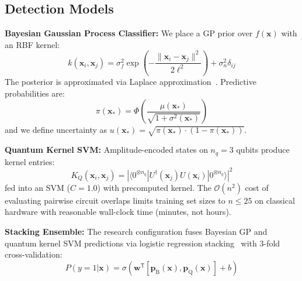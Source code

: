 \documentclass[conference,10pt]{IEEEtran}
\begin{document}
\subsection{Detection Models}

\textbf{Bayesian Gaussian Process Classifier:} We place a GP prior over $f(\mathbf{x})$ with an RBF kernel:
\begin{equation}
k(\mathbf{x}_i, \mathbf{x}_j) = \sigma_f^2 \exp\!\left(-\frac{\|\mathbf{x}_i - \mathbf{x}_j\|^2}{2\ell^2}\right) + \sigma_n^2 \delta_{ij}
\end{equation}
The posterior is approximated via Laplace approximation~\cite{rasmussen2006gaussian}. Predictive probabilities are:
\begin{equation}
\pi(\mathbf{x}_*) = \Phi\!\left(\frac{\mu(\mathbf{x}_*)}{\sqrt{1 + \sigma^2(\mathbf{x}_*)}}\right)
\label{eq:gppredict}
\end{equation}
and we define uncertainty as $u(\mathbf{x}_*) = \sqrt{\pi(\mathbf{x}_*) \cdot (1 - \pi(\mathbf{x}_*))}$.

\textbf{Quantum Kernel SVM:} Amplitude-encoded states on $n_q = 3$ qubits produce kernel entries:
\begin{equation}
K_Q(\mathbf{x}_i, \mathbf{x}_j) = \left|\langle 0^{\otimes n_q} | U^\dagger(\mathbf{x}_j) U(\mathbf{x}_i) | 0^{\otimes n_q}\rangle\right|^2
\end{equation}
fed into an SVM ($C = 1.0$) with precomputed kernel. The $\mathcal{O}(n^2)$ cost of evaluating pairwise circuit overlaps limits training set sizes to $n \leq 25$ on classical hardware with reasonable wall-clock time (minutes, not hours).

\textbf{Stacking Ensemble:} The research configuration fuses Bayesian GP and quantum kernel SVM predictions via logistic regression stacking~\cite{wolpert1992stacked} with 3-fold cross-validation:
\begin{equation}
P(y = 1 | \mathbf{x}) = \sigma\!\left(\mathbf{w}^\mathsf{T} [\mathbf{p}_{\text{B}}(\mathbf{x}), \mathbf{p}_{\text{Q}}(\mathbf{x})] + b\right)
\label{eq:stacking}
\end{equation}
\end{document}
